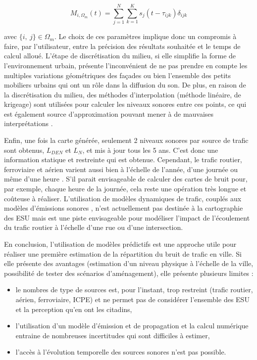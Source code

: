 \begin{equation}
 M_{i,\Omega_m}(t)= \sum_{j = 1}^{N} \sum_{k = 1}^{K} s_{j}(t-\tau_{ijk}) \delta_{ijk}
 \end{equation}


avec $\lbrace i,~j \rbrace \in \Omega_m$. Le choix de ces paramètres implique donc un compromis à faire, par l'utilisateur, entre la précision des résultats souhaitée et le temps de calcul alloué. 
L'étape de discrétisation du milieu, si elle simplifie la forme de l'environnement urbain, présente l'inconvénient de ne pas prendre en compte les multiples variations géométriques des façades ou bien l'ensemble des petits mobiliers urbains qui ont un rôle dans la diffusion du son.
De plus, en raison de la discrétisation du milieu, des méthodes d'interpolation (méthode linéaire, de krigeage) sont utilisées pour calculer les niveaux sonores entre ces points, ce qui est également source d'approximation pouvant mener à de mauvaises interprétations \cite{van_leeuwen_noise_2015}.

Enfin, une fois la carte générée, seulement 2 niveaux sonores par source de trafic sont obtenus, $L_{DEN}$ et $L_N$, et mis à jour tous les 5 ans. C'est donc une information statique et restreinte qui est obtenue. Cependant, le trafic routier, ferroviaire et aérien varient aussi bien à l'échelle de l'année, d'une journée ou même d'une heure \cite{lv2015traffic}. S'il parait envisageable de calculer des cartes de bruit pour, par exemple, chaque heure de la journée, cela reste une opération très longue et coûteuse à réaliser.
L'utilisation de modèles dynamiques de trafic, couplés aux modèles d'émissions sonores \cite{can2010traffic}, n'est actuellement pas destinée à la cartographie des ESU mais est une piste envisageable pour modéliser l'impact de l'écoulement du trafic routier à l'échelle d'une rue ou d'une intersection.

En conclusion, l'utilisation de modèles prédictifs est une approche utile pour réaliser une première estimation de la répartition du bruit de trafic en ville. Si elle présente des avantages (estimation d'un niveau physique à l'échelle de la ville, possibilité de tester des scénarios d'aménagement), elle présente plusieurs limites :

\begin{itemize}
\item le nombres de type de sources est, pour l'instant, trop restreint (trafic routier, aérien, ferroviaire, ICPE) et ne permet pas de considérer l'ensemble des ESU et la perception qu'en ont les citadins,
\item l'utilisation d'un modèle d'émission et de propagation et la calcul numérique entraine de nombreuses incertitudes qui sont difficiles à estimer,
\item l'accès à l'évolution temporelle des sources sonores n'est pas possible.
\end{itemize}

